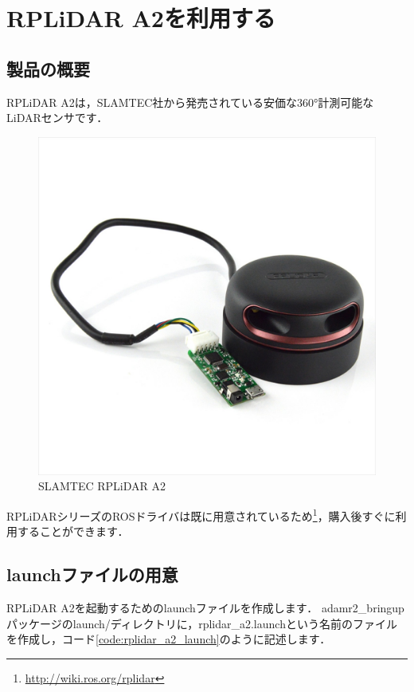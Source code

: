 \documentclass[{../../master}]{subfiles}
\begin{document}
\section{RPLiDAR A2を利用する}

\subsection{製品の概要}

RPLiDAR A2は，SLAMTEC社から発売されている安価な360°計測可能なLiDARセンサです．

\begin{figure}[ht]
  \centering
  \includegraphics[height=50truemm]{images/rplidar_a2.jpg}
  \caption{SLAMTEC RPLiDAR A2}
\end{figure}

RPLiDARシリーズのROSドライバは既に用意されているため\footnote{\url{http://wiki.ros.org/rplidar}}，購入後すぐに利用することができます．

\subsection{launchファイルの用意}
\label{sec:prepare_rplidar_launch}

RPLiDAR A2を起動するためのlaunchファイルを作成します．
\textsf{adamr2\_bringup}パッケージの\textsf{launch/}ディレクトリに，\textsf{rplidar\_a2.launch}という名前のファイルを作成し，コード\ref{code:rplidar_a2_launch}のように記述します．
\end{document}
